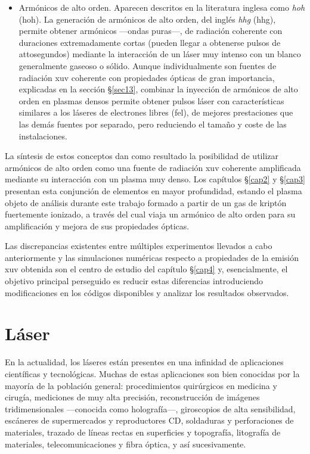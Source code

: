 \begin{itemize}
    \item Armónicos de alto orden. Aparecen descritos en la literatura inglesa como \emph{\acrlong{hoh}} (\acrshort{hoh}). La generación de armónicos de alto orden, del inglés \emph{\acrlong{hhg}} (\acrshort{hhg}), permite obtener armónicos ---ondas puras---, de radiación coherente con duraciones extremadamente cortas (pueden llegar a obtenerse pulsos de attosegundos) mediante la interacción de un láser muy intenso con un blanco generalmente gaseoso o sólido. Aunque individualmente son fuentes de radiación \acrshort{xuv} coherente con propiedades ópticas de gran importancia, explicadas en la sección \S\ref{sec13}, combinar la inyección de armónicos de alto orden en plasmas densos permite obtener pulsos láser con características similares a los láseres de electrones libres (\acrshort{fel}), de mejores prestaciones que las demás fuentes por separado, pero reduciendo el tamaño y coste de las instalaciones. 
\end{itemize}

La síntesis de estos conceptos dan como resultado la posibilidad de utilizar armónicos de alto orden como una fuente de radiación \acrshort{xuv} coherente amplificada mediante su interacción con un plasma muy denso. Los capítulos \S\ref{cap2} y \S\ref{cap3} presentan esta conjunción de elementos en mayor profundidad, estando el plasma objeto de análisis durante este trabajo formado a partir de un gas de kriptón fuertemente ionizado, a través del cual viaja un armónico de alto orden para su amplificación y mejora de sus propiedades ópticas. 

Las discrepancias existentes entre múltiples experimentos llevados a cabo anteriormente y las simulaciones numéricas respecto a propiedades de la emisión \acrshort{xuv} obtenida son el centro de estudio del capítulo \S\ref{cap4} y, esencialmente, el objetivo principal perseguido es reducir estas diferencias introduciendo modificaciones en los códigos disponibles y analizar los resultados observados.

\section{Láser} \label{sec11}
En la actualidad, los láseres están presentes en una infinidad de aplicaciones científicas y tecnológicas. Muchas de estas aplicaciones son bien conocidas por la mayoría de la población general: procedimientos quirúrgicos en medicina y cirugía, mediciones de muy alta precisión, reconstrucción de imágenes tridimensionales ---conocida como holografía---, giroscopios de alta sensibilidad, escáneres de supermercados y reproductores CD, soldaduras y perforaciones de materiales, trazado de líneas rectas en superficies y topografía, litografía de materiales, telecomunicaciones y fibra óptica, y así sucesivamente.

